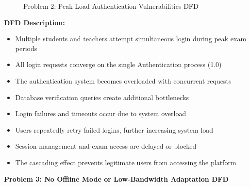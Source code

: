 \documentclass[12pt,a4paper,oneside]{book}
\begin{document}
\begin{figure}[H]
{
    }
    \caption{Problem 2: Peak Load Authentication Vulnerabilities DFD}
\end{figure}

\textbf{DFD Description:} 
\begin{itemize}
    \item Multiple students and teachers attempt simultaneous login during peak exam periods
    \item All login requests converge on the single Authentication process (1.0)
    \item The authentication system becomes overloaded with concurrent requests
    \item Database verification queries create additional bottlenecks
    \item Login failures and timeouts occur due to system overload
    \item Users repeatedly retry failed logins, further increasing system load
    \item Session management and exam access are delayed or blocked
    \item The cascading effect prevents legitimate users from accessing the platform
\end{itemize}

\vspace{0.5cm}
\newpage
\textbf{Problem 3: No Offline Mode or Low-Bandwidth Adaptation DFD}
\end{document}
